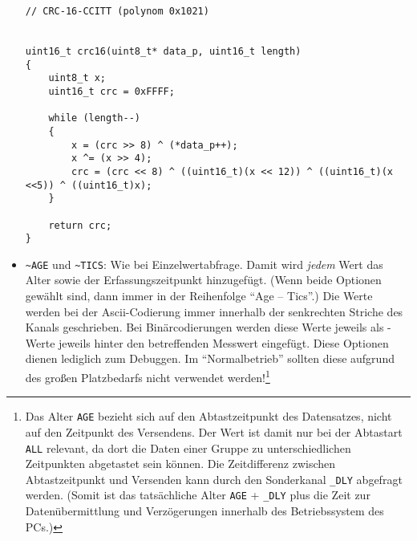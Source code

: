 \begin{itemize}
\begin{lstlisting}[style=C_colored_smallfont]
// CRC-16-CCITT (polynom 0x1021)


uint16_t crc16(uint8_t* data_p, uint16_t length)
{
	uint8_t x;
	uint16_t crc = 0xFFFF;

    while (length--)
    {
        x = (crc >> 8) ^ (*data_p++);
        x ^= (x >> 4);
        crc = (crc << 8) ^ ((uint16_t)(x << 12)) ^ ((uint16_t)(x <<5)) ^ ((uint16_t)x);
    }

    return crc;
}
		\end{lstlisting}
	\item \verb+~AGE+ und \verb+~TICS+: Wie bei Einzelwertabfrage. Damit wird \emph{jedem} Wert das Alter sowie der Erfassungszeitpunkt hinzugefügt. (Wenn beide Optionen gewählt sind, dann immer in der Reihenfolge "`Age -- Tics"'.) Die Werte werden bei der Ascii-Codierung immer innerhalb der senkrechten Striche des Kanals geschrieben. Bei Binärcodierungen werden diese Werte jeweils als -Werte jeweils hinter den betreffenden Messwert eingefügt. Diese Optionen dienen lediglich zum Debuggen. Im "`Normalbetrieb"' sollten diese aufgrund des großen Platzbedarfs nicht verwendet werden!\footnote{Das Alter \texttt{AGE} bezieht sich auf den Abtastzeitpunkt des Datensatzes, nicht auf den Zeitpunkt des Versendens. Der Wert ist damit nur bei der Abtastart \texttt{ALL} relevant, da dort die Daten einer Gruppe zu unterschiedlichen Zeitpunkten abgetastet sein können. Die Zeitdifferenz zwischen Abtastzeitpunkt und Versenden kann durch den Sonderkanal \texttt{\_DLY} abgefragt werden. (Somit ist das tatsächliche Alter \texttt{AGE} + \texttt{\_DLY} plus die Zeit zur Datenübermittlung und Verzögerungen innerhalb des Betriebssystem des PCs.)}
\end{itemize}


